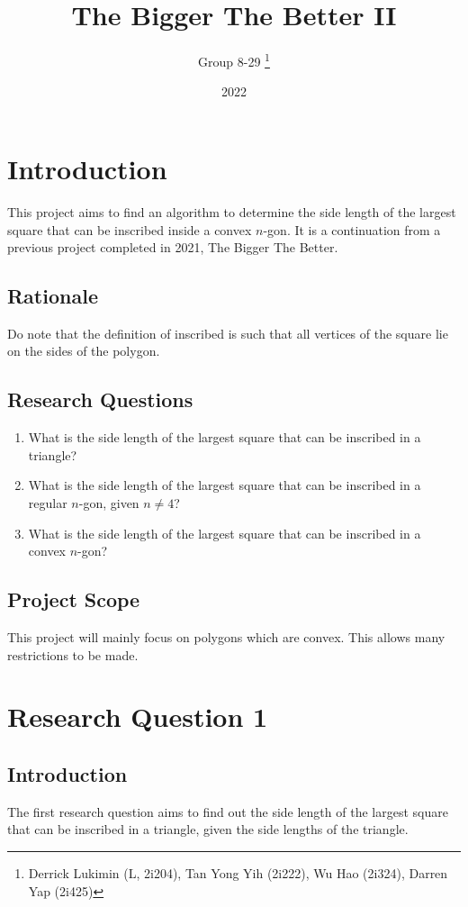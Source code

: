\documentclass[12pt]{scrartcl}
\title{The Bigger The Better II}
\author{Group 8-29 \thanks{Derrick Lukimin (L, 2i204), Tan Yong Yih (2i222), Wu Hao (2i324), Darren Yap (2i425)}}
\date{2022}
\begin{document}
\onehalfspacing
\maketitle
\tableofcontents

\section{Introduction}
This project aims to find an algorithm to determine
the side length of the largest square that can be
inscribed inside a convex $n$-gon. It is a continuation from
a previous project completed in 2021, The Bigger The Better. \cite{tbtb1}

\subsection{Rationale}
Do note that the definition of inscribed is such that all vertices of the square lie on the sides of the polygon.

\subsection{Research Questions}
\begin{enumerate}
	\item What is the side length of the largest square that can be inscribed in a triangle?
	\item What is the side length of the largest square that can be inscribed in a regular $n$-gon, given $n \neq 4$?
	\item What is the side length of the largest square that can be inscribed in a convex $n$-gon?
\end{enumerate}

\subsection{Project Scope}
This project will mainly focus on polygons which are convex. This allows many restrictions to be made.

\section{Research Question 1}

\subsection{Introduction}
The first research question aims to find out the side length of the largest square that can be inscribed in a triangle, given the side lengths of the triangle.
\end{document}
